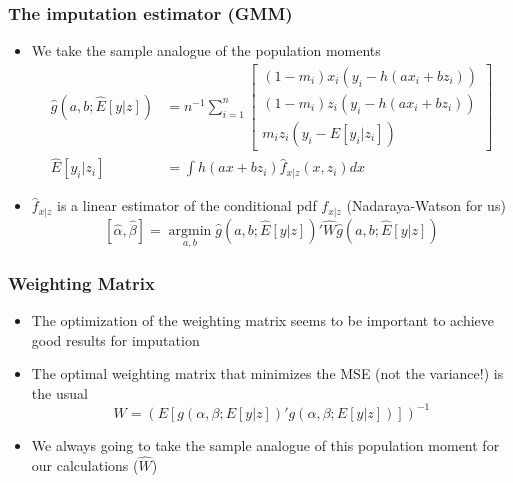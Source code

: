 \documentclass[compress,mathserif]{beamer}
\newcommand{\argmin}{\mathop{\operatorname{argmin}}\limits}
\begin{document}
\begin{frame}\frametitle{The imputation estimator (GMM)}\hypertarget{The imputation estimator (GMM)}{}
\begin{itemize}
\item We take the sample analogue of the population moments
\begin{align*}
    \hat{g}(a,b; \hat{E}[y|z])&=n^{-1}\sum_{i=1}^n\left[\begin{array}{c}
        (1-m_i) x_i(y_i- h(ax_i+bz_i))  \\
        (1-m_i) z_i(y_i- h(ax_i+bz_i)) \\
          m_i z_i(y_i- \hat{E}[y_i|z_i])
    \end{array}\right] \\
    \hat{E}[y_i|z_i]&= \int h(a x+b z_i) \hat{f}_{x|z}(x,z_i)dx
\end{align*}

\item $\hat{f}_{x|z}$ is a linear estimator of the conditional pdf $f_{x|z}$ (Nadaraya-Watson for us)
\[[\hat{\alpha}, \hat{\beta}] = \argmin_{a,b} \hat{g}(a,b;\hat{E}[y|z])'\hat{W}\hat{g}(a,b;\hat{E}[y|z])
\]


\end{itemize}
\end{frame}



\begin{frame}\frametitle{Weighting Matrix}\hypertarget{Weighting Matrix}{}
\begin{itemize}
\item The optimization of the weighting matrix seems to be important to achieve good results for imputation

\item The optimal weighting matrix that minimizes the MSE (not the variance!) is the usual
\[W = \left(E[g(\alpha,\beta; E[y|z])'g(\alpha,\beta; E[y|z])]\right)^{-1}
\]

\item We always going to take the sample analogue of this population moment for our calculations ($\hat{W}$)


\end{itemize}
\end{frame}
\end{document}
